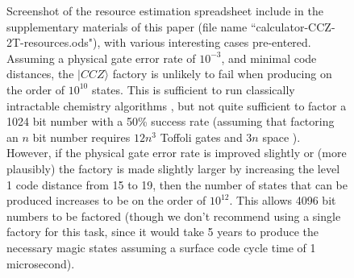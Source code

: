 \documentclass[superscriptaddress,notitlepage,longbibliography]{revtex4-1}
\begin{document}
\begin{figure}[ht]
  \label{fig:spreadsheet}
  \caption{
    Screenshot of the resource estimation spreadsheet include in the supplementary materials of this paper (file name ``calculator-CCZ-2T-resources.ods"), with various interesting cases pre-entered.
    Assuming a physical gate error rate of $10^{-3}$, and minimal code distances, the $|CCZ\rangle$ factory is unlikely to fail when producing on the order of $10^{10}$ states.
    This is sufficient to run classically intractable chemistry algorithms \cite{babbush2018}, but not quite sufficient to factor a 1024 bit number with a 50\% success rate (assuming that factoring an $n$ bit number requires $12 n^3$ Toffoli gates and $3n$ space \cite{zalka1998fast}).
    However, if the physical gate error rate is improved slightly or (more plausibly) the factory is made slightly larger by increasing the level 1 code distance from 15 to 19, then the number of states that can be produced increases to be on the order of $10^{12}$.
    This allows 4096 bit numbers to be factored (though we don't recommend using a single factory for this task, since it would take 5 years to produce the necessary magic states assuming a surface code cycle time of 1 microsecond).
  }
\end{figure}
\end{document}
